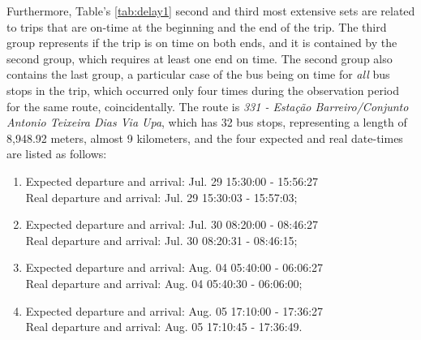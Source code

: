 Furthermore, Table's \ref{tab:delay1} second and third
most extensive sets are related to trips that are on-time at the beginning and the end of the trip. The
third group represents if the trip is on time on both ends, and it is contained by the second group, which requires
at least one end on time. The second group also contains the last group, a particular case of the bus being on time for {\em all} bus stops in the trip, which occurred only four times during the observation period for the same route, coincidentally.
The route is \textit{331 - Estação Barreiro/Conjunto Antonio Teixeira Dias Via Upa}, which has 32 bus stops, representing a length of 8,948.92 meters, almost 9 kilometers, and the four expected and real date-times are listed as follows:
\begin{enumerate}
    \item Expected departure and arrival: Jul. 29 15:30:00 - 15:56:27 \\ Real departure and arrival: Jul. 29 15:30:03 - 15:57:03;
    \item Expected departure and arrival: Jul. 30 08:20:00 - 08:46:27 \\ Real departure and arrival: Jul. 30 08:20:31 - 08:46:15;
    \item Expected departure and arrival: Aug. 04 05:40:00 - 06:06:27 \\ Real departure and arrival: Aug. 04 05:40:30 - 06:06:00;
    \item Expected departure and arrival: Aug. 05 17:10:00 - 17:36:27 \\ Real departure and arrival: Aug. 05 17:10:45 - 17:36:49.
\end{enumerate}

